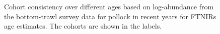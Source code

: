 \documentclass[
  letterpaper,
  DIV=11,
  numbers=noendperiod]{scrreprt}
\begin{document}
\begin{figure}


\caption{\label{fig-consisFTN}Cohort consistency over different ages
based on log-abundance from the bottom-trawl survey data for pollock in
recent years for FTNIRs age estimates. The cohorts are shown in the
labels.}

\end{figure}%
\end{document}
